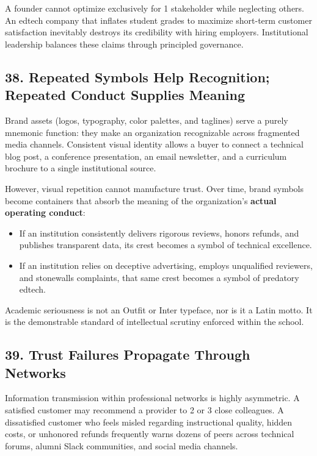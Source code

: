 A founder cannot optimize exclusively for 1 stakeholder while neglecting others. An edtech company that inflates student grades to maximize short-term customer satisfaction inevitably destroys its credibility with hiring employers. Institutional leadership balances these claims through principled governance.

\subsection*{38. Repeated Symbols Help Recognition; Repeated Conduct Supplies Meaning}

Brand assets (logos, typography, color palettes, and taglines) serve a purely mnemonic function: they make an organization recognizable across fragmented media channels. Consistent visual identity allows a buyer to connect a technical blog post, a conference presentation, an email newsletter, and a curriculum brochure to a single institutional source.

However, visual repetition cannot manufacture trust. Over time, brand symbols become containers that absorb the meaning of the organization's \textbf{actual operating conduct}:
\begin{itemize}
\item If an institution consistently delivers rigorous reviews, honors refunds, and publishes transparent data, its crest becomes a symbol of technical excellence.
\item If an institution relies on deceptive advertising, employs unqualified reviewers, and stonewalls complaints, that same crest becomes a symbol of predatory edtech.
\end{itemize}

Academic seriousness is not an Outfit or Inter typeface, nor is it a Latin motto. It is the demonstrable standard of intellectual scrutiny enforced within the school.

\subsection*{39. Trust Failures Propagate Through Networks}

Information transmission within professional networks is highly asymmetric. A satisfied customer may recommend a provider to 2 or 3 close colleagues. A dissatisfied customer who feels misled regarding instructional quality, hidden costs, or unhonored refunds frequently warns dozens of peers across technical forums, alumni Slack communities, and social media channels.

